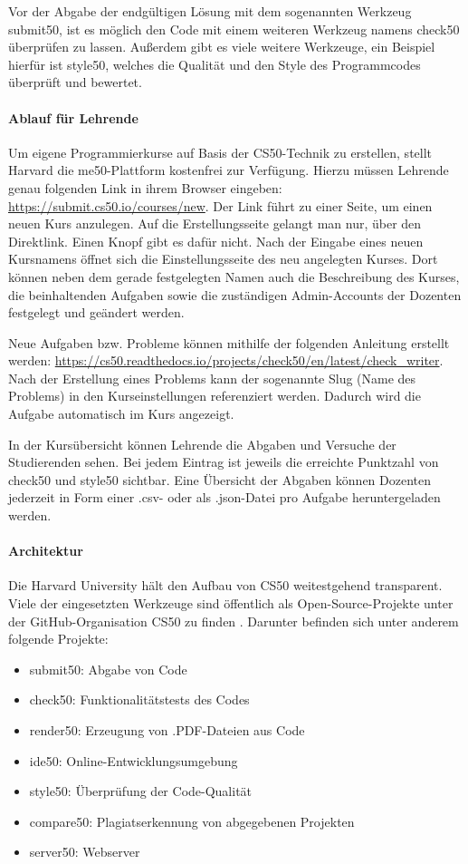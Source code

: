 Vor der Abgabe der endgültigen Lösung mit dem sogenannten Werkzeug
\glqq submit50\grqq{}, ist es möglich den Code mit einem weiteren Werkzeug
namens \glqq check50\grqq{} überprüfen zu lassen. Außerdem gibt es viele weitere
Werkzeuge, ein Beispiel hierfür ist \glqq style50\grqq{}, welches die Qualität
und den Style des Programmcodes überprüft und bewertet. \parencite{submit50}

\paragraph{Ablauf für Lehrende}
Um eigene Programmierkurse auf Basis der CS50-Technik zu erstellen, stellt
Harvard die me50-Plattform kostenfrei zur Verfügung. Hierzu müssen Lehrende
genau folgenden Link in ihrem Browser eingeben:
\url{https://submit.cs50.io/courses/new}. Der Link führt zu
einer Seite, um einen neuen Kurs anzulegen. Auf die Erstellungsseite gelangt man
nur, über den Direktlink. Einen Knopf gibt es dafür nicht. Nach der Eingabe
eines neuen Kursnamens öffnet sich die Einstellungsseite des neu angelegten
Kurses. Dort können neben dem gerade festgelegten Namen auch die Beschreibung
des Kurses, die beinhaltenden Aufgaben sowie die zuständigen Admin-Accounts der
Dozenten festgelegt und geändert werden.

Neue Aufgaben bzw. Probleme können mithilfe der folgenden Anleitung
erstellt werden:
\url{https://cs50.readthedocs.io/projects/check50/en/latest/check_writer}. Nach
der Erstellung eines Problems kann der sogenannte Slug (Name des Problems) in
den Kurseinstellungen referenziert werden. Dadurch wird die Aufgabe automatisch
im Kurs angezeigt.

In der Kursübersicht können Lehrende die Abgaben und Versuche der Studierenden
sehen. Bei jedem Eintrag ist jeweils die erreichte Punktzahl von check50 und
style50 sichtbar. Eine Übersicht der Abgaben können Dozenten jederzeit in Form
einer .csv- oder als .json-Datei pro Aufgabe heruntergeladen werden.

\paragraph{Architektur}
Die Harvard University hält den Aufbau von CS50 weitestgehend transparent.
Viele der eingesetzten Werkzeuge sind öffentlich als Open-Source-Projekte unter
der GitHub-Organisation \glqq CS50\grqq{} zu finden \parencite{cs50-github}. Darunter
befinden sich unter anderem folgende Projekte:
\begin{itemize}
\item submit50: Abgabe von Code
\item check50: Funktionalitätstests des Codes
\item render50: Erzeugung von .PDF-Dateien aus Code
\item ide50: Online-Entwicklungsumgebung
\item style50: Überprüfung der Code-Qualität
\item compare50: Plagiatserkennung von abgegebenen Projekten
\item server50: Webserver
\end{itemize}

